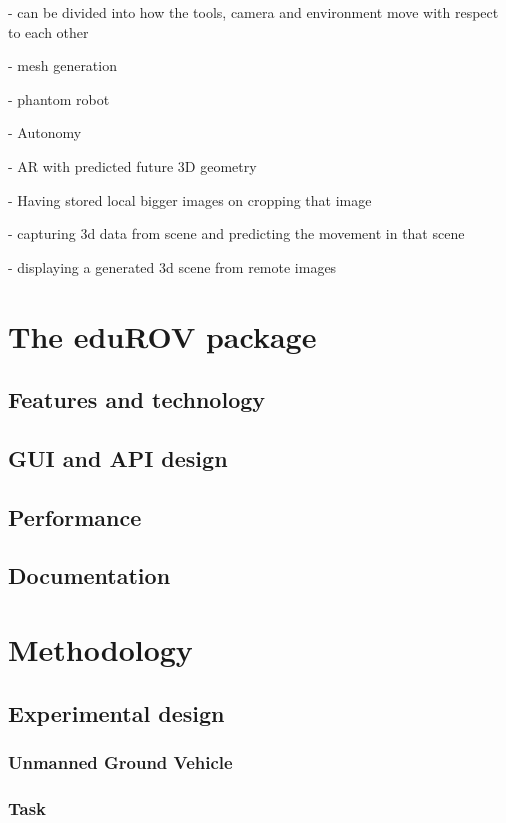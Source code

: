 \documentclass[b5paper,10pt,twoside]{book}
\begin{document}
{{	- can be divided into how the tools, camera and environment move with respect to each other
	
	- mesh generation
	
	- phantom robot
	
	- Autonomy

	- AR with predicted future 3D geometry
	
	- Having stored local bigger images on cropping that image
	
	- capturing 3d data from scene and predicting the movement in that scene
	
	- displaying a generated 3d scene from remote images
	}
	
\chapter{The eduROV package}
	\section{Features and technology}
	\section{GUI and API design}
	\section{Performance}
	\section{Documentation}
	
\chapter{Methodology}
	\section{Experimental design}
		\subsection{Unmanned Ground Vehicle}
		\subsection{Task}
}
\end{document}
